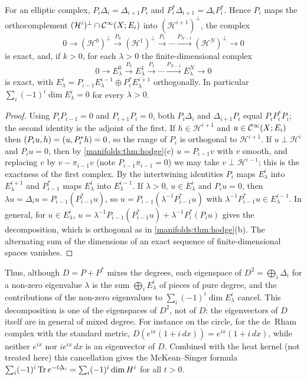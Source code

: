 \begin{proposition}\label{manifolds:prop:eigen-complex}
For an elliptic complex, $P_i\Delta_i=\Delta_{i+1}P_i$ and $P_i^*\Delta_{i+1}=\Delta_iP_i^*$. Hence
$P_i$ maps the orthocomplement $(\mathcal H^i)^\perp\cap\mathcal{C}^\infty(X;E_i)$ into
$(\mathcal H^{i+1})^\perp$, the complex
\begin{equation*}
0\to(\mathcal H^0)^\perp\xrightarrow{P_0}(\mathcal H^1)^\perp\xrightarrow{P_1}\cdots
\xrightarrow{P_{N-1}}(\mathcal H^N)^\perp\to0
\end{equation*}
is exact, and, if $k>0$, for each $\lambda>0$ the finite-dimensional complex
\begin{equation*}
0\to E^0_\lambda\xrightarrow{P_0}E^1_\lambda\xrightarrow{P_1}\cdots\xrightarrow{P_{N-1}}E^N_\lambda\to0
\end{equation*}
is exact, with $E^i_\lambda=P_{i-1}E^{i-1}_\lambda\oplus P_i^*E^{i+1}_\lambda$ orthogonally. In
particular $\sum_i(-1)^i\dim E^i_\lambda=0$ for every $\lambda>0$.
\end{proposition}
\begin{proof}
Using $P_iP_{i-1}=0$ and $P_{i+1}P_i=0$, both $P_i\Delta_i$ and $\Delta_{i+1}P_i$ equal
$P_iP_i^*P_i$; the second identity is the adjoint of the first. If $h\in\mathcal H^{i+1}$ and
$u\in\mathcal{C}^\infty(X;E_i)$ then $( P_iu, h)=( u, P_i^*h)=0$, so the range of $P_i$ is orthogonal
to $\mathcal H^{i+1}$. If $u\perp\mathcal H^i$ and $P_iu=0$, then by \cref{manifolds:thm:hodge}(c)
$u=P_{i-1}v$ with $v$ smooth, and replacing $v$ by $v-\pi_{i-1}v$ (note $P_{i-1}\pi_{i-1}=0$) we
may take $v\perp\mathcal H^{i-1}$; this is the exactness of the first complex. By the
intertwining identities $P_i$ maps $E^i_\lambda$ into $E^{i+1}_\lambda$ and $P_{i-1}^*$ maps
$E^i_\lambda$ into $E^{i-1}_\lambda$. If $\lambda>0$, $u\in E^i_\lambda$ and $P_iu=0$, then
$\lambda u=\Delta_iu=P_{i-1}(P_{i-1}^*u)$, so $u=P_{i-1}(\lambda^{-1}P_{i-1}^*u)$ with
$\lambda^{-1}P_{i-1}^*u\in E^{i-1}_\lambda$. In general, for $u\in E^i_\lambda$,
$u=\lambda^{-1}P_{i-1}(P_{i-1}^*u)+\lambda^{-1}P_i^*(P_iu)$ gives the decomposition, which is
orthogonal as in \cref{manifolds:thm:hodge}(b). The alternating sum of the
dimensions of an exact sequence of finite-dimensional spaces vanishes.
\end{proof}

Thus, although $D=P+P^*$ mixes the degrees, each eigenspace of
$D^2=\bigoplus_i\Delta_i$ for a non-zero eigenvalue $\lambda$ is the sum
$\bigoplus_iE^i_\lambda$ of pieces of pure degree, and the contributions of the
non-zero eigenvalues to $\sum_i(-1)^i\dim E^i_\lambda$ cancel. This decomposition is
one of the eigenspaces of $D^2$, not of $D$: the eigenvectors of $D$ itself are in
general of mixed degree. For instance on the circle, for the de~Rham complex with the
standard metric, $D(e^{ix}(1+i\,dx))=e^{ix}(1+i\,dx)$, while neither $e^{ix}$ nor
$ie^{ix}\,dx$ is an eigenvector of $D$. Combined with the heat kernel (not
treated here) this cancellation gives the McKean--Singer formula
$\sum_i(-1)^i\operatorname{Tr} e^{-t\Delta_i}=\sum_i(-1)^i\dim H^i$ for all $t>0$.

